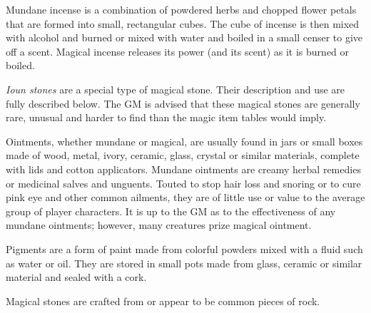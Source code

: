 \begin{multicols}{2}
Mundane incense is a combination of powdered herbs and chopped flower petals that are formed into small, rectangular cubes.  The cube of incense is then mixed with alcohol and burned or mixed with water and boiled in a small censer to give off a scent.  Magical incense releases its power (and its scent) as it is burned or boiled.

\textit{Ioun stones} are a special type of magical stone.  Their description and use are fully described below.  The GM is advised that these magical stones are generally rare, unusual and harder to find than the magic item tables would imply.

Ointments, whether mundane or magical, are usually found in jars or small boxes made of wood, metal, ivory, ceramic, glass, crystal or similar materials, complete with lids and cotton applicators.  Mundane ointments are creamy herbal remedies or medicinal salves and unguents.  Touted to stop hair loss and snoring or to cure pink eye and other common ailments, they are of little use or value to the average group of player characters.  It is up to the GM as to the effectiveness of any mundane ointments; however, many creatures prize magical ointment.

Pigments are a form of paint made from colorful powders mixed with a fluid such as water or oil.  They are stored in small pots made from glass, ceramic or similar material and sealed with a cork.

Magical stones are crafted from or appear to be common pieces of rock.  


\end{multicols}
